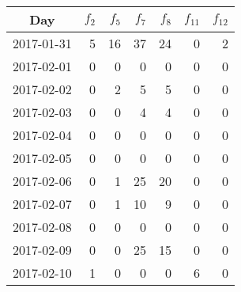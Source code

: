 \centering
\label{table:time-series}
\begin{tabular}{@{}crrrrrr@{}}
	\toprule
	Day        & ${f_2}$ & ${f_5}$ & ${f_7}$ & ${f_8}$ & ${f_{11}}$ & ${f_{12}}$ \\ \midrule
	2017-01-31 & 5       & 16      & 37      & 24      & 0          & 2          \\
	2017-02-01 & 0       & 0       & 0       & 0       & 0          & 0          \\
	2017-02-02 & 0       & 2       & 5       & 5       & 0          & 0          \\
	2017-02-03 & 0       & 0       & 4       & 4       & 0          & 0          \\
	2017-02-04 & 0       & 0       & 0       & 0       & 0          & 0          \\
	2017-02-05 & 0       & 0       & 0       & 0       & 0          & 0          \\
	2017-02-06 & 0       & 1       & 25      & 20      & 0          & 0          \\
	2017-02-07 & 0       & 1       & 10      & 9       & 0          & 0          \\
	2017-02-08 & 0       & 0       & 0       & 0       & 0          & 0          \\
	2017-02-09 & 0       & 0       & 25      & 15      & 0          & 0          \\
	2017-02-10 & 1       & 0       & 0       & 0       & 6          & 0          \\ \bottomrule
\end{tabular}%

